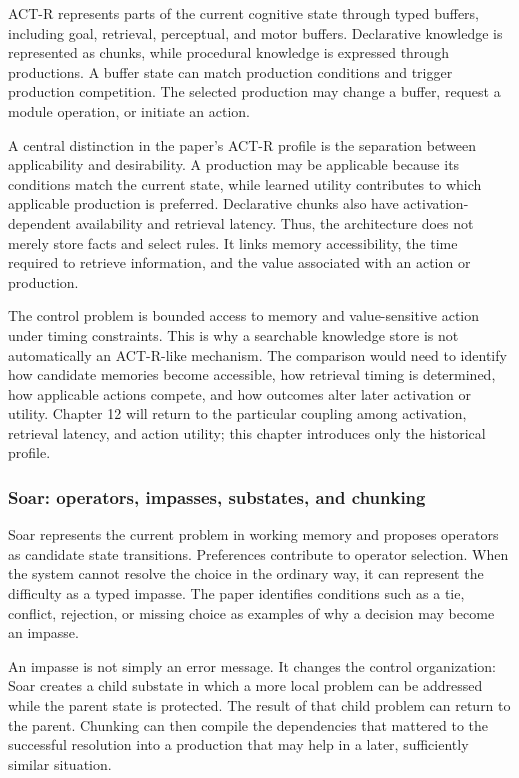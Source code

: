 ACT-R represents parts of the current cognitive state through typed buffers, including goal, retrieval, perceptual, and motor buffers. Declarative knowledge is represented as chunks, while procedural knowledge is expressed through productions. A buffer state can match production conditions and trigger production competition. The selected production may change a buffer, request a module operation, or initiate an action.

A central distinction in the paper's ACT-R profile is the separation between applicability and desirability. A production may be applicable because its conditions match the current state, while learned utility contributes to which applicable production is preferred. Declarative chunks also have activation-dependent availability and retrieval latency. Thus, the architecture does not merely store facts and select rules. It links memory accessibility, the time required to retrieve information, and the value associated with an action or production.

The control problem is bounded access to memory and value-sensitive action under timing constraints. This is why a searchable knowledge store is not automatically an ACT-R-like mechanism. The comparison would need to identify how candidate memories become accessible, how retrieval timing is determined, how applicable actions compete, and how outcomes alter later activation or utility. Chapter 12 will return to the particular coupling among activation, retrieval latency, and action utility; this chapter introduces only the historical profile.

\subsubsection{Soar: operators, impasses, substates, and chunking}

Soar represents the current problem in working memory and proposes operators as candidate state transitions. Preferences contribute to operator selection. When the system cannot resolve the choice in the ordinary way, it can represent the difficulty as a typed impasse. The paper identifies conditions such as a tie, conflict, rejection, or missing choice as examples of why a decision may become an impasse.

An impasse is not simply an error message. It changes the control organization: Soar creates a child substate in which a more local problem can be addressed while the parent state is protected. The result of that child problem can return to the parent. Chunking can then compile the dependencies that mattered to the successful resolution into a production that may help in a later, sufficiently similar situation.

